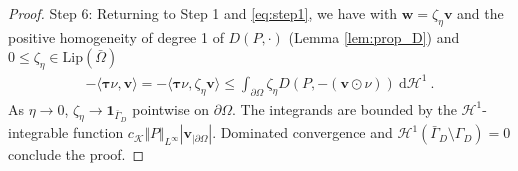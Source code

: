 \documentclass[10pt,a4paper]{amsart}
\newcommand{\K}{\mathcal{K}}
\newcommand{\bftau}{\boldsymbol{\tau}}
\newcommand{\bfv}{\boldsymbol{v}}
\newcommand{\bfw}{\boldsymbol{w}}
\newcommand{\dd}{\:\mathrm{d}}
\begin{document}
\begin{proof}
    Step 6:
    Returning to Step 1 and \eqref{eq:step1}, we have with $\bfw = \zeta_\eta\bfv$ and the positive homogeneity
    of degree 1 of $D(P,\cdot)$ (Lemma \ref{lem:prop_D}) and $0\leq\zeta_\eta\in\mathrm{Lip}(\bar\Omega)$
    \begin{align*}
        -\langle \bftau\nu, \bfv\rangle = - \langle \bftau\nu, \zeta_\eta \bfv\rangle
        \leq \int_{\partial\Omega} \zeta_\eta D(P, -(\bfv\odot \nu)) \dd \mathcal{H}^1 \ .
    \end{align*}
    As $\eta\rightarrow 0$, $\zeta_\eta \rightarrow \mathbf 1_{\bar\Gamma_D}$ pointwise on $\partial\Omega$.
    The integrands are bounded by the $\mathcal{H}^{1}$-integrable function
    $c_\K \Vert P\Vert_{L^{\infty}}|\bfv_{|\partial\Omega}|$.
    Dominated convergence and $\mathcal{H}^{1}(\bar\Gamma_D\setminus\Gamma_D) =0$ conclude the proof.
\end{proof}
\end{document}
